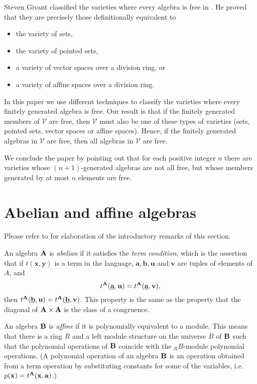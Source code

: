 Steven Givant classified the varieties where every algebra is free
in \cite{givant}.
He proved that they
are precisely those definitionally equivalent to
\begin{itemize}
\item the variety of sets,
\item the variety of pointed sets,
\item a variety of vector spaces over a division ring, or
\item a variety of affine spaces over a division ring.
\end{itemize}
In this paper we use different techniques
to classify the varieties where every
finitely generated algebra is free.
Our result is that if the finitely generated members of
$\mathcal V$ are free, then $\mathcal V$
must also be one of these types of varieties
(sets, pointed sets, vector spaces or affine spaces).
Hence, if the finitely generated algebras
in $\mathcal V$ are free, then all algebras in $\mathcal V$ are free.

We conclude the paper by pointing out that
for each positive integer $n$ there are varieties
whose $(n+1)$-generated algebras are not all free, but whose 
members generated by at most $n$ elements are free.

\section{Abelian and affine algebras}
Please refer to \cite{freese-mckenzie, hobby-mckenzie, kearnes-kiss}
for elaboration of the introductory remarks of this section.

An algebra ${{\mathbf{\uppercase{a}}}}$
is \emph{abelian} if it satisfies the \emph{term condition},
which is the assertion that if $t({{\mathbf{{x}}}},{{\mathbf{{y}}}})$ is a term
in the language, ${{\mathbf{{a}}}}, {{\mathbf{{b}}}}, {{\mathbf{{u}}}}$ and ${{\mathbf{{v}}}}$
are tuples of elements of $A$, and
\[
t^{{{\mathbf{\uppercase{a}}}}}(\underline{{{\mathbf{{a}}}}},{{\mathbf{{u}}}}) = t^{{{\mathbf{\uppercase{a}}}}}(\underline{{{\mathbf{{a}}}}},{{\mathbf{{v}}}}), 
\]
then $t^{{{\mathbf{\uppercase{a}}}}}(\underline{{{\mathbf{{b}}}}},{{\mathbf{{u}}}}) =
t^{{{\mathbf{\uppercase{a}}}}}(\underline{{{\mathbf{{b}}}}},{{\mathbf{{v}}}})$. This property
is the same as the property that the diagonal of ${{\mathbf{\uppercase{a}}}}\times {{\mathbf{\uppercase{a}}}}$
is the class of a congruence.

An algebra ${{\mathbf{\uppercase{b}}}}$ is \emph{affine} if it is polynomially equivalent
to a module. This means that there is a ring $R$ and a left
module structure on the universe $B$ of ${{\mathbf{\uppercase{b}}}}$ such that
the polynomial operations of ${{\mathbf{\uppercase{b}}}}$ coincide with the
${}_RB$-module polynomial operations. (A polynomial
operation of an algebra ${{\mathbf{\uppercase{b}}}}$ is an operation
obtained from a term operation by substituting constants for
some of the variables, i.e. $p({{\mathbf{{x}}}}) = t^{{{\mathbf{\uppercase{a}}}}}({{\mathbf{{x}}}},{{\mathbf{{a}}}})$.)

